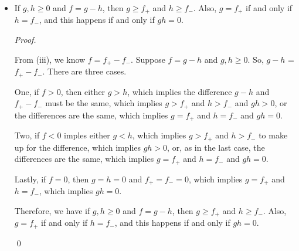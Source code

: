 \documentclass[12pt]{article}
\newenvironment{problem}[2][Problem]{\begin{trivlist}
\item[\hskip \labelsep {\bfseries #1}\hskip \labelsep {\bfseries
#2.}]}{\end{trivlist}}
\newenvironment{sol}
    {\emph{Proof.}
    }
    {
    \qed
    }
\begin{document}
\begin{problem}{48}
\begin{itemize}
          \item[(iv)] If $g,h \geq 0$ and $f = g - h$, then $g \geq f_+$ and $h \geq f_-$. Also, $g = f_+$ if and only if $h = f_-$, and this happens if and only if $gh = 0$.  
          
          \begin{sol}
            From (iii), we know $f = f_+ - f_-$. Suppose $f = g - h$ and $g,h \geq 0$. So, $g - h$ = $f_+ - f_-$. There are three cases. 
            
            \hspace{1em} One, if $f > 0$, then either $g > h$, which implies the difference $g - h$ and $f_+ - f_-$ must be the same, which implies $g > f_+$ and $h > f_-$ and $gh > 0$, or the differences are the same, which implies $g = f_+$ and $h = f_-$ and $gh = 0$. 
            
            \hspace{1em} Two, if $f < 0$ imples either $g < h$, which implies $g > f_+$ and $h > f_-$ to make up for the difference, which implies $gh > 0$, or, as in the last case, the differences are the same, which implies $g = f_+$ and $h = f_-$ and $gh = 0$. 
      
            \hspace{1em} Lastly, if $f = 0$, then $g = h = 0$ and $f_+ = f_- = 0$, which implies $g = f_+$ and $h = f_-$, which implies $gh = 0$.
      
            \hspace{1em} Therefore, we have if $g,h \geq 0$ and $f = g - h$, then $g \geq f_+$ and $h \geq f_-$. Also, $g = f_+$ if and only if $h = f_-$, and this happens if and only if $gh = 0$. 
          \end{sol}
        \end{itemize}
      \end{problem}
\end{document}

